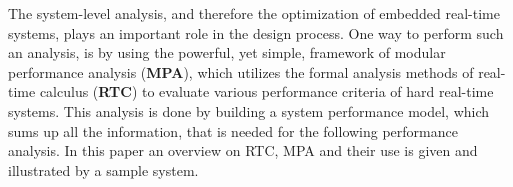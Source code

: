 The system-level analysis, and therefore the optimization of embedded real-time systems, plays an important role in the design process.
One way to perform such an analysis, is by using the powerful, yet simple, framework of modular performance analysis (\textbf{MPA}), which utilizes the formal analysis methods
of real-time calculus (\textbf{RTC}) to evaluate various performance criteria of hard real-time systems.
This analysis is done by building a system performance model, which sums up all the information, that is
needed for the following performance analysis.
In this paper an overview on RTC, MPA and their use is given and illustrated by a sample system.